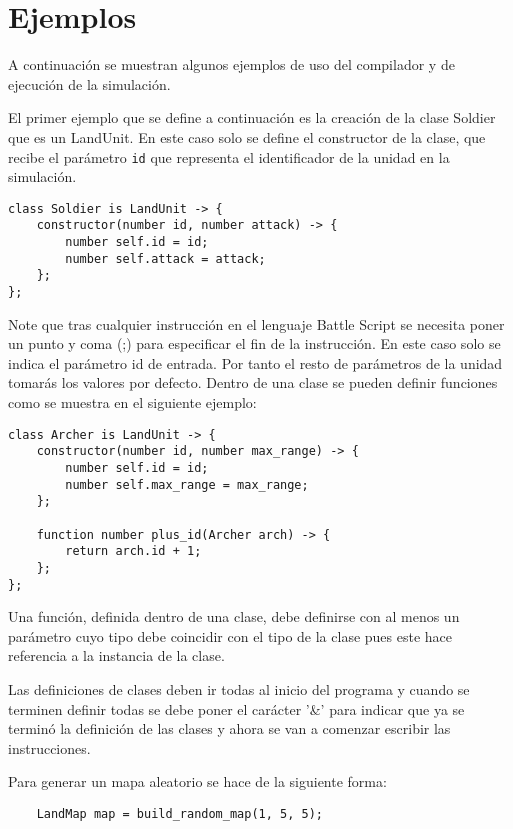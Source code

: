 \section{Ejemplos}

A continuación se muestran algunos ejemplos de uso del compilador y de ejecución de la simulación.

El primer ejemplo que se define a continuación es la creación de la clase Soldier que es un LandUnit. En este caso solo se define el constructor de la clase, que recibe el parámetro \verb|id| que representa el identificador de la unidad en la simulación.

\begin{verbatim}
class Soldier is LandUnit -> {  
    constructor(number id, number attack) -> {
        number self.id = id;
        number self.attack = attack;
    };
}; 
\end{verbatim}

Note que tras cualquier instrucción en el lenguaje Battle Script se necesita poner un punto y coma (;) para especificar el fin de la instrucción. En este caso solo se indica el par\'ametro id de entrada. Por tanto el resto de par\'ametros de la unidad tomar\'as los valores por defecto. Dentro de una clase se pueden definir funciones como se muestra en el siguiente ejemplo:

\begin{verbatim}
class Archer is LandUnit -> {
    constructor(number id, number max_range) -> {
        number self.id = id;
        number self.max_range = max_range;
    };
		
    function number plus_id(Archer arch) -> {
        return arch.id + 1;
    };
};
\end{verbatim}

Una funci\'on, definida dentro de una clase, debe definirse con al menos un par\'ametro cuyo tipo debe coincidir con el tipo de la clase pues este hace referencia a la instancia de la clase.

Las definiciones de clases deben ir todas al inicio del programa y cuando se terminen definir todas se debe poner el car\'acter '\&' para indicar que ya se termin\'o la definici\'on de las clases y ahora se van a comenzar escribir las instrucciones.

Para generar un mapa aleatorio se hace de la siguiente forma:

\begin{verbatim}
	LandMap map = build_random_map(1, 5, 5);
\end{verbatim} 

